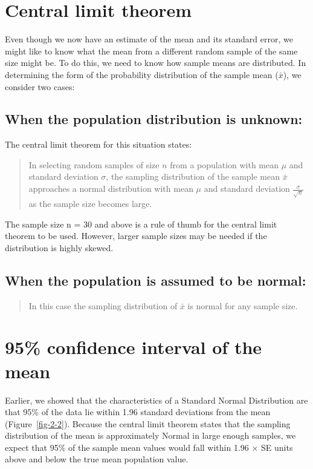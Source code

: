 \documentclass[
  a4paper,
]{memoir}
\begin{document}
\section{Central limit theorem}\label{central-limit-theorem}

Even though we now have an estimate of the mean and its standard error,
we might like to know what the mean from a different random sample of
the same size might be. To do this, we need to know how sample means are
distributed. In determining the form of the probability distribution of
the sample mean (\(\bar{x}\)), we consider two cases:

\subsection{When the population distribution is
unknown:}\label{when-the-population-distribution-is-unknown}

The central limit theorem for this situation states:

\begin{quote}
In selecting random samples of size \(n\) from a population with mean
\(\mu\) and standard deviation \(\sigma\), the sampling distribution of
the sample mean \(\bar{x}\) approaches a normal distribution with mean
\(\mu\) and standard deviation \(\tfrac{\sigma}{\sqrt{n}}\) as the
sample size becomes large.
\end{quote}

The sample size n = 30 and above is a rule of thumb for the central
limit theorem to be used. However, larger sample sizes may be needed if
the distribution is highly skewed.

\subsection{When the population is assumed to be
normal:}\label{when-the-population-is-assumed-to-be-normal}

\begin{quote}
In this case the sampling distribution of \(\bar{x}\) is normal for any
sample size.
\end{quote}

\section{95\% confidence interval of the
mean}\label{confidence-interval-of-the-mean}

Earlier, we showed that the characteristics of a Standard Normal
Distribution are that 95\% of the data lie within 1.96 standard
deviations from the mean (Figure~\ref{fig-2-2}). Because the central
limit theorem states that the sampling distribution of the mean is
approximately Normal in large enough samples, we expect that 95\% of the
sample mean values would fall within 1.96 × SE units above and below the
true mean population value.
\end{document}
